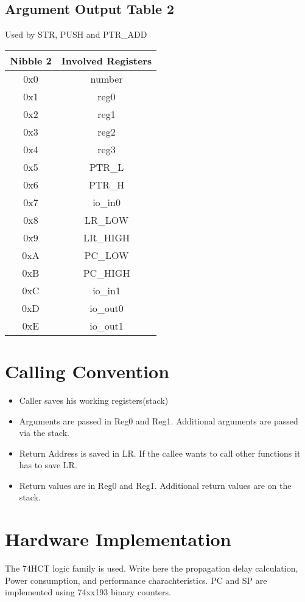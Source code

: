 \documentclass[a4paper, 12pt]{article}
\begin{document}
	\subsection{Argument Output Table 2}
	Used by STR, PUSH and PTR\_ADD
	\begin{center}
		\begin{tabular}{|c|c|}
			\hline
			Nibble 2 & Involved Registers \\ \hline
			0x0 & number \\ \hline
			0x1 & reg0 \\ \hline
			0x2 & reg1 \\ \hline
			0x3 & reg2 \\ \hline
			0x4 & reg3 \\ \hline
			0x5 & PTR\_L \\ \hline
			0x6 & PTR\_H \\ \hline
			0x7 & io\_in0 \\ \hline
			0x8 & LR\_LOW \\ \hline
			0x9 & LR\_HIGH \\ \hline
			0xA & PC\_LOW \\ \hline
			0xB & PC\_HIGH \\ \hline
			0xC & io\_in1 \\ \hline
			0xD & io\_out0 \\ \hline
			0xE & io\_out1 \\ \hline
		\end{tabular}
	\end{center}
	\section{Calling Convention}
	\begin{itemize}
		\item Caller saves his working registers(stack)
		\item Arguments are passed in Reg0 and Reg1. Additional arguments are passed via the stack.
		\item Return Address is saved in LR. If the callee wants to call other functions it has to save LR.
		\item Return values are in Reg0 and Reg1. Additional return values are on the stack.
	\end{itemize}
	\section{Hardware Implementation}
	The 74HCT logic family is used.  Write here the propagation delay calculation, Power consumption, and performance charachteristics.
	PC and SP are implemented using 74xx193 binary counters.
\end{document}
